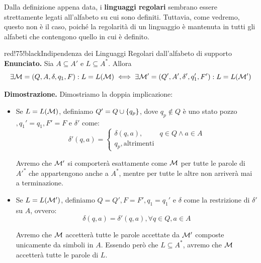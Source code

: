 
Dalla definizione appena data, i \textbf{linguaggi regolari} sembrano essere strettamente legati all'alfabeto su cui sono definiti. Tuttavia, come vedremo, questo non è il caso, poiché la regolarità di un linguaggio è mantenuta in tutti gli alfabeti che contengono quello in cui è definito.

\begin{halfframedbox}{red!75!black}{Indipendenza dei Linguaggi Regolari dall'alfabeto di supporto}
  \textbf{Enunciato. } Sia \(A \subseteq A'\) e \(L \subseteq A^*\). Allora
  \begin{equation}
    \exists\mathcal{M}=(Q,A,\delta,q_1,F):L=L(\mathcal{M}) \iff \exists\mathcal{M}'=(Q', A', \delta', q_1', F'):L=L(\mathcal{M}')
  \end{equation}

  \begin{center}
    \textcolor{red!75!black}{\hdashrule[0.5ex]{18cm}{1pt}{3mm 3pt 1mm 2pt}}
  \end{center}

  \textbf{Dimostrazione. } Dimostriamo la doppia implicazione:
  \begin{itemize}
    \item[``\(\Rightarrow\)''] Se \(L=L(\mathcal{M}) \), definiamo \(Q'=Q\cup\displaystyle{\left\{{q_p}\right\}}\), dove \(q_p \nin Q\) è uno stato pozzo\(, q_1'=q_1, F'=F\) e \(\delta'\) come:
    \begin{equation}
      \delta'(q,a)=\begin{cases}
        \delta(q,a), & q \in Q \land a \in A\\
        q_p, \text{altrimenti}
      \end{cases}
    \end{equation}

    Avremo che \(\mathcal{M}'\) si comporterà esattamente come \(\mathcal{M}\) per tutte le parole di \(A'^*\) che appartengono anche a \(A^*\), mentre per tutte le altre non arriverà mai a terminazione.
    \item[``\(\Leftarrow\)''] Se \(L=L(\mathcal{M}')\), definiamo \(Q=Q', F=F', q_1=q_1'\) e \(\delta\) come la restrizione di \(\delta'\) su \(A\), ovvero:
    \begin{equation}
      \delta(q,a)=\delta'(q,a), \forall q \in Q, a \in A
    \end{equation}

    Avremo che \(\mathcal{M}\) accetterà tutte le parole accettate da \(\mathcal{M}'\) composte unicamente da simboli in \(A\). Essendo però che \(L\subseteq A^*\), avremo che \(\mathcal{M}\) accetterà tutte le parole di \(L\).
  \end{itemize}
\end{halfframedbox}

